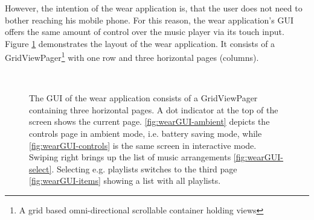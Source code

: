 However, the intention of the wear application is, that the user does not need to bother reaching his mobile phone. For this reason, the wear application's \ac{GUI} offers the same amount of control over the music player via its touch input. Figure \ref{fig:wearGUI} demonstrates the layout of the wear application. It consists of a GridViewPager\footnote{A grid based omni-directional scrollable container holding views} with one row and three horizontal pages (columns). 

\begin{figure}[bth]
	\myfloatalign
	 \quad
	 \quad
	 \\
	\caption{ The \ac{GUI} of the wear application consists of a GridViewPager containing three horizontal pages. A dot indicator at the top of the screen shows the current page. \ref{fig:wearGUI-ambient} depicts the controls page in ambient mode, i.e. battery saving mode, while \ref{fig:wearGUI-controls} is the same screen in interactive mode. Swiping right brings up the list of music arrangements \ref{fig:wearGUI-select}. Selecting e.g. playlists switches to the third page \ref{fig:wearGUI-items} showing a list with all playlists.}
	\label{fig:wearGUI}
\end{figure}

